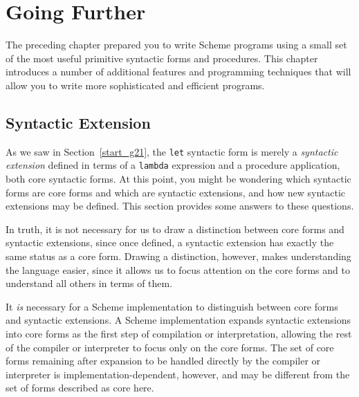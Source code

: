 \chapter{Going Further\label{further_CHPTGOINGFURTHER}}
\label{further_g49}
\label{further_h0}
\begin{figure}[H]
\centering
\setlength{\fboxrule}{3pt}
\end{figure}
\clearpage





The preceding chapter prepared you to write Scheme programs using
a small set of the most useful primitive syntactic forms and
procedures.
This chapter introduces a number of additional features and
programming techniques that will allow you to write more sophisticated
and efficient programs.


\section{\label{further_g50}\label{further_h1}Syntactic Extension\label{further_SECTGFSYNTAX}}



As we saw in Section \ref{start_g21}, the \texttt{let} syntactic form is merely
a \textit{syntactic extension} defined in terms of a \texttt{lambda} expression and
a procedure application, both \label{further_s0}core syntactic forms.
At this point, you might be wondering which \label{further_s1}syntactic forms are core forms
and which are \label{further_s2}syntactic extensions, and how new syntactic extensions
may be defined.  This section provides some answers to these questions.


In truth, it is not necessary for us to draw a distinction between
core forms and syntactic extensions, since once defined, a syntactic
extension has exactly the same status as a core form.
Drawing a distinction, however, makes understanding the language
easier, since it allows us to focus attention on the core forms
and to understand all others in terms of them.


It \textit{is} necessary for a Scheme implementation to distinguish between core
forms and syntactic extensions.
A Scheme implementation \label{further_s3}expands syntactic extensions
into core forms as the first step of compilation or interpretation, allowing
the rest of the compiler or interpreter to focus only on the core forms.
The set of core forms remaining after expansion to be handled directly
by the compiler or interpreter is implementation-dependent, however,
and may be different from the set of forms described as core here.


